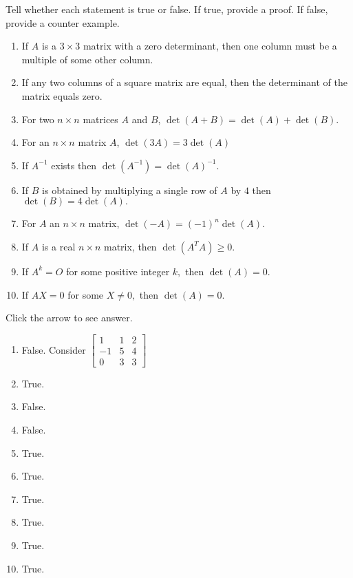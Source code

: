 \documentclass{ximera}
\begin{document}
\begin{problem}\label{prb:7.21} Tell whether each statement is true or false. If true, provide a proof. If false, provide a counter example.
\begin{enumerate}
\item If $A$ is a $3\times 3$ matrix with a zero determinant, then one
column must be a multiple of some other column.

\item If any two columns of a square matrix are equal, then the determinant
of the matrix equals zero.

\item For two $n\times n$ matrices $A$ and $B$, $\det \left( A+B\right)
=\det \left( A\right) +\det \left( B\right) .$

\item For an $n\times n$ matrix $A$, $\det \left( 3A\right) =3\det \left(
A\right) $

\item If $A^{-1}$ exists then $\det \left( A^{-1}\right) =\det \left(
A\right) ^{-1}.$

\item If $B$ is obtained by multiplying a single row of $A$ by $4$ then $%
\det \left( B\right) =4\det \left( A\right) .$

\item For $A$ an $n\times n$ matrix, $\det \left( -A\right) =\left(
-1\right) ^{n}\det \left( A\right) .$

\item If $A$ is a real $n\times n$ matrix, then $\det \left( A^{T}A\right)
\geq 0.$

\item If $A^{k}=O$ for some positive integer $k,$ then $\det \left(
A\right) =0.$

\item If $AX=0$ for some $X \neq 0,$ then $\det \left(
A\right) =0.$
\end{enumerate}

Click the arrow to see answer.
\begin{expandable}
\begin{enumerate}
\item False. Consider $\left[
\begin{array}{rrr}
1 & 1 & 2 \\
-1 & 5 & 4 \\
0 & 3 & 3
\end{array}
\right] $
\item True.
\item False.
\item False.
\item True.
\item True.
\item True.
\item True.
\item True.
\item True.
\end{enumerate}
\end{expandable}
\end{problem}
\end{document}
